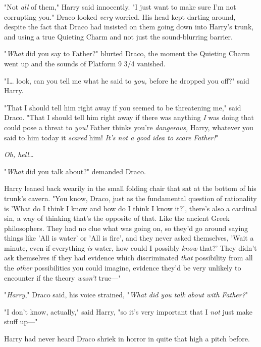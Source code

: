 "Not \emph{all} of them," Harry said innocently. "I just want to make sure I'm 
not corrupting you."
\sbreak
Draco looked \emph{very} worried. His head kept darting around, despite the 
fact that Draco had insisted on them going down into Harry's trunk, and using a 
true Quieting Charm and not just the sound-blurring barrier.

"\emph{What} did you say to Father?" blurted Draco, the moment the Quieting 
Charm went up and the sounds of Platform 9 3/4 vanished.

"I{\ldots} look, can you tell me what he said to \emph{you,} before he dropped 
you off?" said Harry.

"That I should tell him right away if you seemed to be threatening me," said 
Draco. "That I should tell him right away if there was anything \emph{I} was 
doing that could pose a threat to \emph{you!} Father thinks you're 
\emph{dangerous,} Harry, whatever you said to him today it \emph{scared} him! 
\emph{It's not a good idea to scare Father!}"

\emph{Oh, hell{\ldots}}

"\emph{What} did you talk about?" demanded Draco.

Harry leaned back wearily in the small folding chair that sat at the bottom of 
his trunk's cavern. "You know, Draco, just as the fundamental question of 
rationality is 'What do I think I know and how do I think I know it?', there's 
also a cardinal sin, a way of thinking that's the opposite of that. Like the 
ancient Greek philosophers. They had no clue what was going on, so they'd go 
around saying things like 'All is water' or 'All is fire', and they never asked 
themselves, 'Wait a minute, even if everything \emph{is} water, how could I 
possibly \emph{know} that?' They didn't ask themselves if they had evidence 
which discriminated \emph{that} possibility from all the \emph{other} 
possibilities you could imagine, evidence they'd be very unlikely to encounter 
if the theory \emph{wasn't} true---"

"\emph{Harry}," Draco said, his voice strained, "\emph{What did you talk about 
with Father?}"

"I don't know, actually," said Harry, "so it's very important that I \emph{not} 
just make stuff up---"

Harry had never heard Draco shriek in horror in quite that high a pitch before.